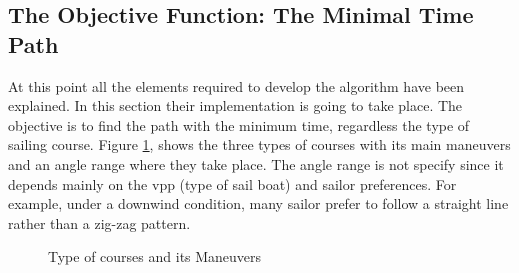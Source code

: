 \subsection{The Objective Function: The Minimal Time Path}
At this point all the elements required to develop the algorithm have been explained. In this section their implementation is going to take place. The objective is to find the path with the minimum time, regardless the type of sailing course. Figure \ref{fig:SailModes_Man}, shows the three types of courses with its main maneuvers and an angle range where they take place. The angle range is not specify since it depends mainly on the \acrshort{vpp} (type of sail boat) and sailor preferences. For example, under a downwind condition, many sailor prefer to follow a straight line rather than a zig-zag pattern.  \par
\begin{figure} [hbt!]
  \centering
  \hfill 
  \caption{Type of courses and its Maneuvers \cite{Alves2014ASailboat}}
\label{fig:SailModes_Man} 
\end{figure}

